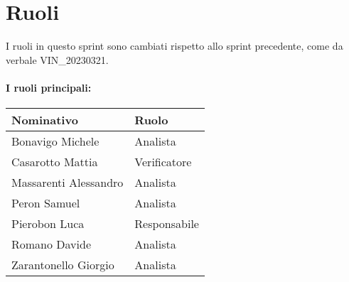 \section{Ruoli}

I ruoli in questo sprint sono cambiati rispetto allo sprint precedente, come da verbale VIN\_20230321.

\paragraph{I ruoli principali:}

\begin{center}
    \begin{tabularx}{\textwidth}{X l}

        \rowcolor{gray!30} \textbf{Nominativo} & \textbf{Ruolo}\\

        \hline

        Bonavigo Michele & Analista \\
        \rowcolor{gray!10}Casarotto Mattia & Verificatore \\
        Massarenti Alessandro & Analista \\
        \rowcolor{gray!10}Peron Samuel & Analista \\
        Pierobon Luca & Responsabile \\
        \rowcolor{gray!10}Romano Davide & Analista \\
        Zarantonello Giorgio & Analista \\

    \end{tabularx}
\end{center}